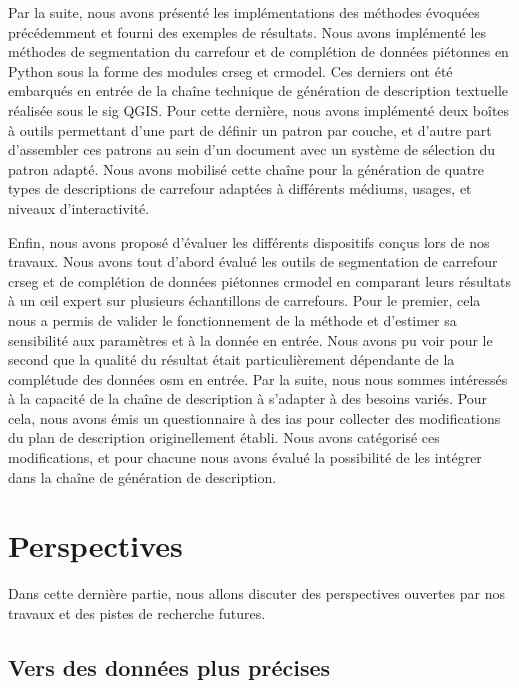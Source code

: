 Par la suite, nous avons présenté les implémentations des méthodes évoquées précédemment et fourni des exemples de résultats. Nous avons implémenté les méthodes de segmentation du carrefour et de complétion de données piétonnes en Python sous la forme des modules crseg et crmodel. Ces derniers ont été embarqués en entrée de la chaîne technique de génération de description textuelle réalisée sous le \gls{sig} QGIS. Pour cette dernière, nous avons implémenté deux boîtes à outils permettant d'une part de définir un patron par couche, et d'autre part d'assembler ces patrons au sein d'un document avec un système de sélection du patron adapté. Nous avons mobilisé cette chaîne pour la génération de quatre types de descriptions de carrefour adaptées à différents médiums, usages, et niveaux d'interactivité. 

\newpar{}

Enfin, nous avons proposé d'évaluer les différents dispositifs conçus lors de nos travaux. Nous avons tout d'abord évalué les outils de segmentation de carrefour crseg et de complétion de données piétonnes crmodel en comparant leurs résultats à un œil expert sur plusieurs échantillons de carrefours. Pour le premier, cela nous a permis de valider le fonctionnement de la méthode et d'estimer sa sensibilité aux paramètres et à la donnée en entrée. Nous avons pu voir pour le second que la qualité du résultat était particulièrement dépendante de la complétude des données \gls{osm} en entrée. Par la suite, nous nous sommes intéressés à la capacité de la chaîne de description à s'adapter à des besoins variés. Pour cela, nous avons émis un questionnaire à des \glspl{ia} pour collecter des modifications du plan de description originellement établi. Nous avons catégorisé ces modifications, et pour chacune nous avons évalué la possibilité de les intégrer dans la chaîne de génération de description.

\section{Perspectives}

Dans cette dernière partie, nous allons discuter des perspectives ouvertes par nos travaux et des pistes de recherche futures.

\subsection{Vers des données plus précises}

